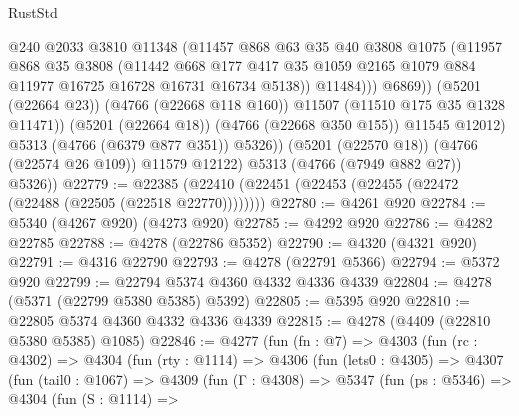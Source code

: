 \begin{lexlean}{RustStd}
\begin{coremodule}
{\begin{coremodule}
{{{{{{{{{{{{{{{{{{{{{{{{{{{{{{{{{{{                          @240
                          @2033
                          @3810
                          @11348
                          (@11457
                            @868
                            @63
                            @35
                            @40
                            @3808
                            @1075
                            (@11957
                              @868
                              @35
                              @3808
                              (@11442
                                @668
                                @177
                                @417
                                @35
                                @1059
                                @2165
                                @1079
                                @884
                                @11977
                                @16725
                                @16728
                                @16731
                                @16734
                                @5138))
                            @11484)))
                      @6869))
                  (@5201 (@22664 @23))
                  (@4766 (@22668 @118 @160))
                  @11507
                  (@11510 @175 @35 @1328 @11471))
                (@5201 (@22664 @18))
                (@4766 (@22668 @350 @155))
                @11545
                @12012)
              @5313
              (@4766 (@6379 @877 @351))
              @5326))
          (@5201 (@22570 @18))
          (@4766 (@22574 @26 @109))
          @11579
          @12122)
        @5313
        (@4766 (@7949 @882 @27))
        @5326))
@22779 := @22385 (@22410 (@22451 (@22453 (@22455 (@22472 (@22488 (@22505 (@22518 @22770))))))))
@22780 := @4261 @920
@22784 := @5340 (@4267 @920) (@4273 @920)
@22785 := @4292 @920
@22786 := @4282 @22785
@22788 := @4278 (@22786 @5352)
@22790 := @4320 (@4321 @920)
@22791 := @4316 @22790
@22793 := @4278 (@22791 @5366)
@22794 := @5372 @920
@22799 := @22794 @5374 @4360 @4332 @4336 @4339
@22804 := @4278 (@5371 (@22799 @5380 @5385) @5392)
@22805 := @5395 @920
@22810 := @22805 @5374 @4360 @4332 @4336 @4339
@22815 := @4278 (@4409 (@22810 @5380 @5385) @1085)
@22846 := @4277
    (fun (fn : @7) =>
    @4303
      (fun (rc : @4302) =>
      @4304
        (fun (rty : @1114) =>
        @4306
          (fun (lets0 : @4305) =>
          @4307
            (fun (tail0 : @1067) =>
            @4309
              (fun (Γ : @4308) =>
              @5347
                (fun (ps : @5346) =>
                @4304
                  (fun (S : @1114) =>
}}}}}}}}}}}}}}}}}}}}}}}}}}}}}}}}}}}
\end{coremodule}}
\end{coremodule}
\end{lexlean}
